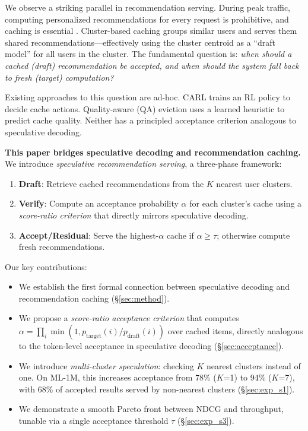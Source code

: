 \documentclass{article}
\begin{document}
We observe a striking parallel in recommendation serving. During peak traffic, computing personalized recommendations for every request is prohibitive, and caching is essential \citep{carl2024, rpaf2024}. Cluster-based caching groups similar users and serves them shared recommendations---effectively using the cluster centroid as a ``draft model'' for all users in the cluster. The fundamental question is: \emph{when should a cached (draft) recommendation be accepted, and when should the system fall back to fresh (target) computation?}

Existing approaches to this question are ad-hoc. CARL \citep{carl2024} trains an RL policy to decide cache actions. Quality-aware (QA) eviction uses a learned heuristic to predict cache quality. Neither has a principled acceptance criterion analogous to speculative decoding.

\textbf{This paper bridges speculative decoding and recommendation caching.} We introduce \emph{speculative recommendation serving}, a three-phase framework:
\begin{enumerate}
    \item \textbf{Draft}: Retrieve cached recommendations from the $K$ nearest user clusters.
    \item \textbf{Verify}: Compute an acceptance probability $\alpha$ for each cluster's cache using a \emph{score-ratio criterion} that directly mirrors speculative decoding.
    \item \textbf{Accept/Residual}: Serve the highest-$\alpha$ cache if $\alpha \geq \tau$; otherwise compute fresh recommendations.
\end{enumerate}

Our key contributions:
\begin{itemize}
    \item We establish the first formal connection between speculative decoding and recommendation caching (\S\ref{sec:method}).
    \item We propose a \emph{score-ratio acceptance criterion} that computes $\alpha = \prod_i \min(1, p_{\text{target}}(i) / p_{\text{draft}}(i))$ over cached items, directly analogous to the token-level acceptance in speculative decoding (\S\ref{sec:acceptance}).
    \item We introduce \emph{multi-cluster speculation}: checking $K$ nearest clusters instead of one. On ML-1M, this increases acceptance from 78\% ($K$=1) to 94\% ($K$=7), with 68\% of accepted results served by non-nearest clusters (\S\ref{sec:exp_s1}).
    \item We demonstrate a smooth Pareto front between NDCG and throughput, tunable via a single acceptance threshold $\tau$ (\S\ref{sec:exp_s3}).
\end{itemize}
\end{document}
